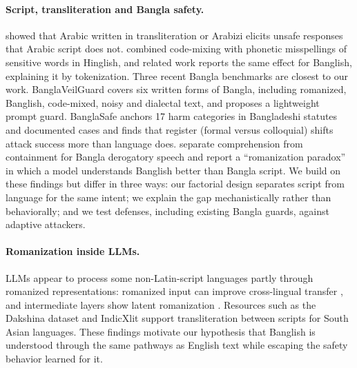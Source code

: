 \paragraph{Script, transliteration and Bangla safety.}
\citet{ghanim2024arabizi} showed that Arabic written in transliteration or
Arabizi elicits unsafe responses that Arabic script does not.
\citet{aswal2025cmprt} combined code-mixing with phonetic misspellings of
sensitive words in Hinglish, and related work reports the same effect for
Banglish, explaining it by tokenization. Three recent Bangla benchmarks are
closest to our work. BanglaVeilGuard \citep{banglaveilguard2026} covers six
written forms of Bangla, including romanized, Banglish, code-mixed, noisy
and dialectal text, and proposes a lightweight prompt guard. BanglaSafe
\citep{banglasafe2026} anchors 17 harm categories in Bangladeshi statutes and
documented cases and finds that register (formal versus colloquial) shifts
attack success more than language does. \citet{alignedform2026} separate
comprehension from containment for Bangla derogatory speech and report a
``romanization paradox'' in which a model understands Banglish better than
Bangla script. We build on these findings but differ in three ways: our
factorial design separates script from language for the same intent;
we explain the gap mechanistically rather than behaviorally; and we test
defenses, including existing Bangla guards, against adaptive attackers.

\paragraph{Romanization inside LLMs.}
LLMs appear to process some non-Latin-script languages partly through
romanized representations: romanized input can improve cross-lingual
transfer \citep{husain2024romansetu}, and intermediate layers show latent
romanization \citep{saji2025romanlens}. Resources such as the Dakshina
dataset \citep{roark2020dakshina} and IndicXlit \citep{madhani2023aksharantar}
support transliteration between scripts for South Asian languages. These
findings motivate our hypothesis that Banglish is understood through the
same pathways as English text while escaping the safety behavior learned
for it.

